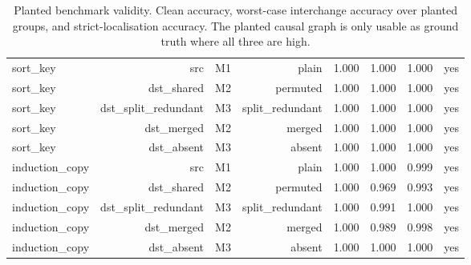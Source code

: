 \begin{table}[t]
\begin{tabular}{lrrrrrrr}
sort\_key & src & M1 & plain & 1.000 & 1.000 & 1.000 & yes \\
sort\_key & dst\_shared & M2 & permuted & 1.000 & 1.000 & 1.000 & yes \\
sort\_key & dst\_split\_redundant & M3 & split\_redundant & 1.000 & 1.000 & 1.000 & yes \\
sort\_key & dst\_merged & M2 & merged & 1.000 & 1.000 & 1.000 & yes \\
sort\_key & dst\_absent & M3 & absent & 1.000 & 1.000 & 1.000 & yes \\
induction\_copy & src & M1 & plain & 1.000 & 1.000 & 0.999 & yes \\
induction\_copy & dst\_shared & M2 & permuted & 1.000 & 0.969 & 0.993 & yes \\
induction\_copy & dst\_split\_redundant & M3 & split\_redundant & 1.000 & 0.991 & 1.000 & yes \\
induction\_copy & dst\_merged & M2 & merged & 1.000 & 0.989 & 0.998 & yes \\
induction\_copy & dst\_absent & M3 & absent & 1.000 & 1.000 & 1.000 & yes \\
\bottomrule
\end{tabular}
\caption{Planted benchmark validity. Clean accuracy, worst-case interchange accuracy over planted groups, and strict-localisation accuracy. The planted causal graph is only usable as ground truth where all three are high.}
\label{tab:benchmark_validity}
\end{table}